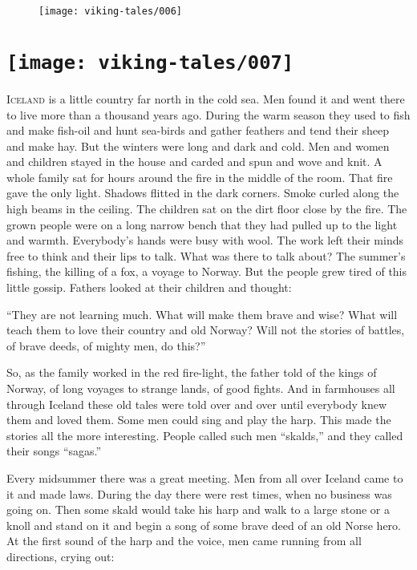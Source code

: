 \begin{figure}
    \centering
    \texttt{[image: viking-tales/006]}
\end{figure}
\listoffigures

\chapter[\itshape What the Sagas Were]{
    \texttt{[image: viking-tales/007]}}

\lettrine{I}{celand} is a little country far north in the cold sea. Men
found it and went there to live more than a thousand years ago. During
the warm season they used to fish and make fish-oil and hunt sea-birds
and gather feathers and tend their sheep and make hay. But the winters
were long and dark and cold. Men and women and children stayed in the
house and carded and spun and wove and knit. A whole family sat for hours
around the fire in the middle of the room. That fire gave the only light.
Shadows flitted in the dark corners. Smoke curled along the high beams
in the ceiling. The children sat on the dirt floor close by the fire.
The grown people were on a long narrow bench that they had pulled up to
the light and warmth. Everybody's hands were busy with wool. The work
left their minds free to think and their lips to talk. What was there to
talk about? The summer's fishing, the killing of a fox, a voyage to
Norway. But the people grew tired of this little gossip. Fathers looked
at their children and thought:

``They are not learning much. What will make them brave and wise? What
will teach them to love their country and old Norway? Will not the
stories of battles, of brave deeds, of mighty men, do this?''

So, as the family worked in the red fire-light, the father told of the
kings of Norway, of long voyages to strange lands, of good fights. And
in farmhouses all through Iceland these old tales were told over and
over until everybody knew them and loved them. Some men could sing and
play the harp. This made the stories all the more interesting. People
called such men ``skalds,'' and they called their songs ``sagas.''

Every midsummer there was a great meeting. Men from all over Iceland
came to it and made laws. During the day there were rest times, when no
business was going on. Then some skald would take his harp and walk to a
large stone or a knoll and stand on it and begin a song of some brave
deed of an old Norse hero. At the first sound of the harp and the voice,
men came running from all directions, crying out:

